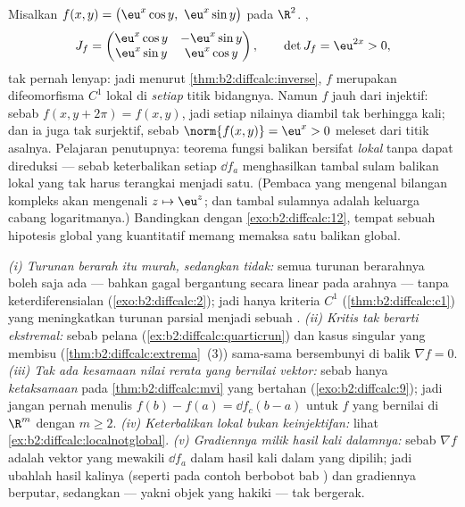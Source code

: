 \begin{example}\label{ex:b2:diffcalc:localnotglobal}
Misalkan $f(x, y) = \bigl(\eu^x\cos y,\ \eu^x\sin y\bigr)$ pada
$\R^2$. ,
\[
J_f = \begin{pmatrix}
\eu^x\cos y & -\eu^x\sin y\\
\eu^x\sin y & \eu^x\cos y
\end{pmatrix},
\qquad
\det J_f = \eu^{2x} > 0 ,
\]
tak pernah lenyap: jadi menurut \cref{thm:b2:diffcalc:inverse}, $f$ merupakan
difeomorfisma $C^1$ lokal di \emph{setiap} titik bidangnya.
Namun $f$ jauh dari injektif: sebab $f(x, y + 2\pi) = f(x, y)$, jadi
setiap nilainya diambil tak berhingga kali; dan ia juga tak surjektif,
sebab $\norm{f(x, y)} = \eu^x > 0$ meleset dari titik asalnya.
Pelajaran penutupnya: teorema fungsi balikan bersifat
\emph{lokal} tanpa dapat direduksi --- sebab keterbalikan setiap $\dd f_a$ menghasilkan
tambal sulam balikan lokal yang tak harus terangkai menjadi satu.
(Pembaca yang mengenal bilangan kompleks akan mengenali $z \mapsto
\eu^z$; dan tambal sulamnya adalah keluarga cabang logaritmanya.)
Bandingkan dengan \cref{exo:b2:diffcalc:12}, tempat sebuah hipotesis global
yang kuantitatif memang memaksa satu balikan global.
\end{example}

\begin{remark}
\emph{(i) Turunan berarah itu murah, sedangkan 
tidak:} semua turunan berarahnya boleh saja ada --- bahkan gagal
bergantung secara linear pada arahnya --- tanpa
keterdiferensialan (\cref{exo:b2:diffcalc:2}); jadi hanya kriteria $C^1$
(\cref{thm:b2:diffcalc:c1}) yang meningkatkan turunan parsial menjadi sebuah
. \emph{(ii) Kritis tak berarti ekstremal:}
sebab pelana (\cref{ex:b2:diffcalc:quarticrun}) dan kasus singular
yang membisu (\cref{thm:b2:diffcalc:extrema}~(3)) sama-sama bersembunyi
di balik $\nabla f = 0$. \emph{(iii) Tak ada kesamaan nilai rerata
yang bernilai vektor:} sebab hanya \emph{ketaksamaan} pada
\cref{thm:b2:diffcalc:mvi} yang bertahan
(\cref{exo:b2:diffcalc:9}); jadi jangan pernah menulis $f(b) - f(a) = \dd
f_c(b-a)$ untuk $f$ yang bernilai di $\R^m$ dengan $m \geq 2$.
\emph{(iv) Keterbalikan lokal bukan keinjektifan:} lihat
\cref{ex:b2:diffcalc:localnotglobal}. \emph{(v) Gradiennya
milik hasil kali dalamnya:} sebab $\nabla f$ adalah vektor yang
mewakili $\dd f_a$ dalam hasil kali dalam yang dipilih; jadi ubahlah
hasil kalinya (seperti pada contoh berbobot bab )
dan gradiennya berputar, sedangkan  ---
yakni objek yang hakiki --- tak bergerak.
\end{remark}

